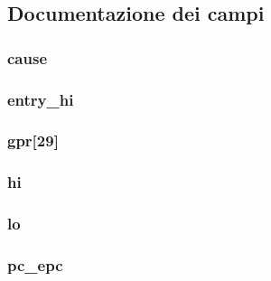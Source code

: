 \subsection{Documentazione dei campi}
\hypertarget{structstate__t_a977139f16407ef0c648e940dabe05318}{
\subsubsection[{cause}]{ cause}}\label{structstate__t_a977139f16407ef0c648e940dabe05318}
\hypertarget{structstate__t_a867e8a3789b0868e6fe3cb734b8d7e34}{
\subsubsection[{entry\-\_\-hi}]{ entry\-\_\-hi}}\label{structstate__t_a867e8a3789b0868e6fe3cb734b8d7e34}
\hypertarget{structstate__t_aff9aa91408afefa93942d0e288b73c96}{
\subsubsection[{gpr}]{ gpr\mbox{[}29\mbox{]}}}\label{structstate__t_aff9aa91408afefa93942d0e288b73c96}
\hypertarget{structstate__t_a0e34aeb4eba44f3971bb1bf383435897}{
\subsubsection[{hi}]{ hi}}\label{structstate__t_a0e34aeb4eba44f3971bb1bf383435897}
\hypertarget{structstate__t_a55f6b3c956fb70c8ef13c4a00ccd3a7b}{
\subsubsection[{lo}]{ lo}}\label{structstate__t_a55f6b3c956fb70c8ef13c4a00ccd3a7b}
\hypertarget{structstate__t_ac0cfee10c7a13bb3749604cd15892217}{
\subsubsection[{pc\-\_\-epc}]{ pc\-\_\-epc}}\label{structstate__t_ac0cfee10c7a13bb3749604cd15892217}
